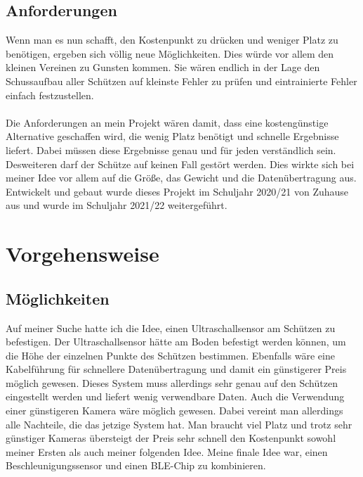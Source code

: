\subsection{Anforderungen}
Wenn man es nun schafft, den Kostenpunkt zu drücken und weniger Platz zu benötigen,
ergeben sich völlig neue Möglichkeiten. Dies würde vor allem den kleinen Vereinen zu Gunsten 
kommen. Sie wären endlich in der Lage den Schussaufbau aller Schützen auf kleinste Fehler 
zu prüfen und eintrainierte Fehler einfach festzustellen.\\
\\
Die Anforderungen an mein Projekt wären damit, dass eine kostengünstige Alternative 
geschaffen wird, die wenig Platz benötigt und schnelle Ergebnisse liefert. Dabei müssen diese 
Ergebnisse genau und für jeden verständlich sein.\\
Desweiteren darf der Schütze auf keinen Fall gestört werden.
Dies wirkte sich bei meiner Idee vor allem auf die Größe, das Gewicht und die 
Datenübertragung aus.\\
Entwickelt und gebaut wurde dieses Projekt im Schuljahr 2020/21 von Zuhause aus und wurde 
im Schuljahr 2021/22 weitergeführt.

\section{Vorgehensweise}
\subsection{Möglichkeiten}
Auf meiner Suche hatte ich die Idee, einen Ultraschallsensor am Schützen zu befestigen. Der 
Ultraschallsensor hätte am Boden befestigt werden können, um die Höhe der einzelnen 
Punkte des Schützen bestimmen. Ebenfalls wäre eine Kabelführung für schnellere 
Datenübertragung und damit ein günstigerer Preis möglich gewesen. Dieses System muss allerdings 
sehr genau auf den Schützen eingestellt werden und liefert wenig verwendbare Daten.
Auch die Verwendung einer günstigeren Kamera wäre möglich gewesen. Dabei vereint man 
allerdings alle Nachteile, die das jetzige System hat. Man braucht viel Platz und trotz sehr 
günstiger Kameras übersteigt der Preis sehr schnell den Kostenpunkt sowohl meiner Ersten 
als auch meiner folgenden Idee.
Meine finale Idee war, einen Beschleunigungssensor und einen BLE-Chip zu kombinieren.

%

